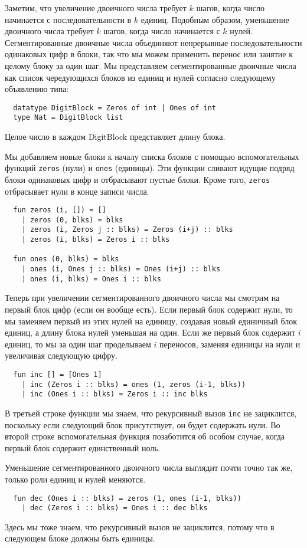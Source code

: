 Заметим, что увеличение двоичного числа требует $k$ шагов, когда число
начинается с последовательности в $k$ единиц. Подобным образом,
уменьшение двоичного числа требует $k$ шагов, когда число начинается
с $k$ нулей. Сегментированные двоичные числа объединяют непрерывные
последовательности одинаковых цифр в блоки, так что мы можем применить
перенос или занятие к целому блоку за один шаг. Мы представляем
сегментированные двоичные числа как список чередующихся блоков из
единиц и нулей согласно следующему объявлению типа:
\begin{lstlisting}
  datatype DigitBlock = Zeros of int | Ones of int
  type Nat = DigitBlock list
\end{lstlisting}
Целое число в каждом DigitBlock представляет длину блока.

Мы добавляем новые блоки к началу списка блоков с помощью
вспомогательных функций
\lstinline!zeros! (нули) и \lstinline!ones! (единицы). Эти функции
сливают идущие подряд блоки одинаковых цифр и отбрасывают
пустые блоки.  Кроме того, \lstinline!zeros! отбрасывает нули в конце
записи числа.
\begin{lstlisting}
  fun zeros (i, []) = []
    | zeros (0, blks) = blks
    | zeros (i, Zeros j :: blks) = Zeros (i+j) :: blks
    | zeros (i, blks) = Zeros i :: blks

  fun ones (0, blks) = blks
    | ones (i, Ones j :: blks) = Ones (i+j) :: blks
    | ones (i, blks) = Ones i :: blks
\end{lstlisting}
Теперь при увеличении сегментированного двоичного числа мы смотрим на
первый блок цифр (если он вообще есть). Если первый блок содержит
нули, то мы заменяем первый из этих нулей на единицу, создавая новый
единичный блок единиц, а длину блока нулей уменьшая на один. Если же
первый блок содержит $i$ единиц, то мы за один шаг проделываем $i$
переносов, заменяя единицы на нули и увеличивая следующую цифру.
\begin{lstlisting}
  fun inc [] = [Ones 1]
    | inc (Zeros i :: blks) = ones (1, zeros (i-1, blks))
    | inc (Ones i :: blks) = Zeros i :: inc blks
\end{lstlisting}
В третьей строке функции мы знаем, что рекурсивный вызов
\lstinline!inc! не зациклится, поскольку если следующий блок
присутствует, он будет содержать нули. Во второй строке
вспомогательная функция позаботится об особом случае, когда первый
блок содержит единственный ноль.

Уменьшение сегментированного двоичного числа выглядит почти точно так
же, только роли единиц и нулей меняются.
\begin{lstlisting}
  fun dec (Ones i :: blks) = zeros (1, ones (i-1, blks))
    | dec (Zeros i :: blks) = Ones i :: dec blks
\end{lstlisting}
Здесь мы тоже знаем, что рекурсивный вызов не зациклится, потому что в
следующем блоке должны быть единицы.

